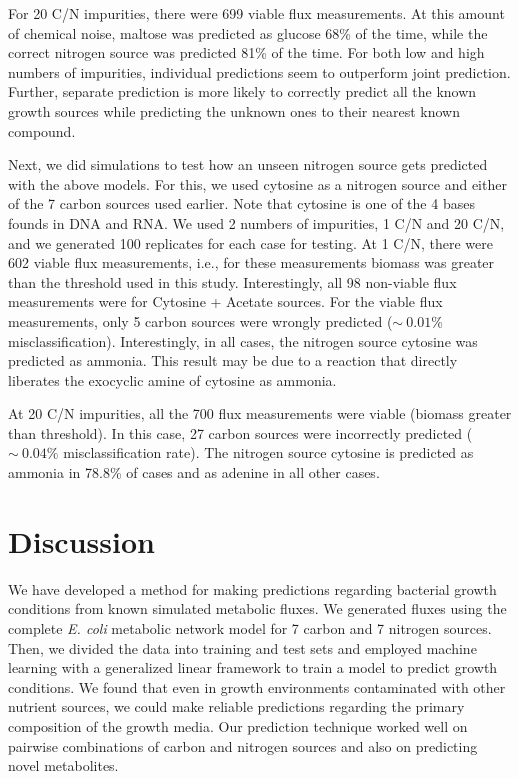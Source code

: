 \documentclass[12pt]{article}
\begin{document}
For 20 C/N impurities, there were 699 viable flux measurements. At this amount of chemical noise, maltose was predicted as glucose 68\% of the time, while the correct nitrogen source was predicted 81\% of the time. For both low and high numbers of impurities, individual predictions seem to outperform joint prediction. Further, separate prediction is more likely to correctly predict all the known growth sources while predicting the unknown ones to their nearest known compound.

Next, we did simulations to test how an unseen nitrogen source gets predicted with the above models. For this, we used cytosine as a nitrogen source and either of the 7 carbon sources used earlier. Note that cytosine is one of the 4 bases founds in DNA and RNA. We used 2 numbers of impurities, 1 C/N and 20 C/N, and we generated 100 replicates for each case for testing. At 1 C/N, there were 602 viable flux measurements, i.e., for these measurements biomass was greater than the threshold used in this study. Interestingly, all 98 non-viable flux measurements were for Cytosine + Acetate sources. For the viable flux measurements, only 5 carbon sources were wrongly predicted ($\sim~0.01\%$ misclassification). Interestingly, in all cases, the nitrogen source cytosine was predicted as ammonia. This result may be due to a reaction that directly liberates the exocyclic amine of cytosine as ammonia.

At 20 C/N impurities, all the 700 flux measurements were viable (biomass greater than threshold). In this case, 27 carbon sources were incorrectly predicted ($\sim~0.04\%$ misclassification rate). The nitrogen source cytosine is predicted as ammonia in 78.8\% of cases and as adenine in all other cases.

\section{Discussion}

We have developed a method for making predictions regarding bacterial growth conditions from known simulated metabolic fluxes. We generated fluxes using the complete \emph{E. coli} metabolic network model for 7 carbon and 7 nitrogen sources. Then, we divided the data into training and test sets and employed machine learning with a generalized linear framework to train a model to predict growth conditions. We found that even in growth environments contaminated with other nutrient sources, we could make reliable predictions regarding the primary composition of the growth media.
Our prediction technique worked well on pairwise combinations of carbon and nitrogen sources and also on predicting novel metabolites.
\end{document}

